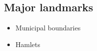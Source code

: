 \subsection*{Major landmarks}
\begin{itemize}
    \item Municipal boundaries
    \item Hamlets
\end{itemize}
\label{map:basemap}
\label{map:aerialimagery2016}
\label{Aerial Imagery 2016}
\label{map:aerialimagery2017}
\label{Aerial Imagery 2017}